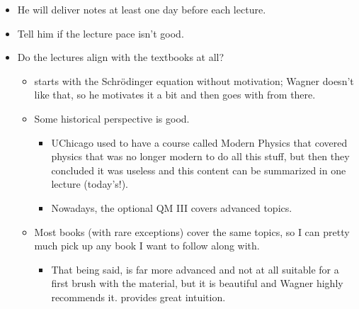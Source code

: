 \documentclass[../notes.tex]{subfiles}
\begin{document}
\begin{itemize}
    \item He will deliver notes at least one day before each lecture.
    \item Tell him if the lecture pace isn't good.
    \item Do the lectures align with the textbooks at all?
    \begin{itemize}
        \item \textcite{bib:Griffiths} starts with the Schr\"{o}dinger equation without motivation; Wagner doesn't like that, so he motivates it a bit and then goes with \textcite{bib:Griffiths} from there.
        \item Some historical perspective is good.
        \begin{itemize}
            \item UChicago used to have a course called Modern Physics that covered physics that was no longer modern to do all this stuff, but then they concluded it was useless and this content can be summarized in one lecture (today's!).
            \item Nowadays, the optional QM III covers advanced topics.
        \end{itemize}
        \item Most books (with rare exceptions) cover the same topics, so I can pretty much pick up any book I want to follow along with.
        \begin{itemize}
            \item That being said, \textcite{bib:Landau} is far more advanced and not at all suitable for a first brush with the material, but it is beautiful and Wagner highly recommends it. \textcite{bib:Landau} provides great intuition.
        \end{itemize}
    \end{itemize}
\end{itemize}
\end{document}
